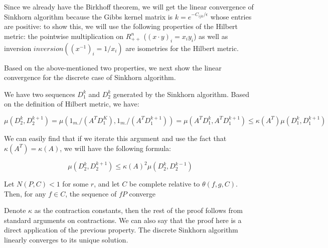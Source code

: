 
Since we already have the Birkhoff theorem, we will get the linear convergence of Sinkhorn algorithm because the Gibbs kernel matrix is $k=e^{-C_{ijk}/\epsilon}$ whose entries are positive: to show this, we will use the following properties of the Hilbert metric: 
the pointwise multiplication on $R_{++}^n$ ($(x\cdot y)_i = x_i y_i$) as well as inversion $inversion((x^{-1})_i = 1/x_i)$ are isometries for the Hilbert metric. 


Based on the above-mentioned two properties, we next show the linear convergence for the discrete case of Sinkhorn algorithm.

We have two sequences $D_1^k$ and $D_2^k$ generated by the Sinkhorn algorithm. Based on the definition of Hilbert metric, we have:

\begin{equation}
    \mu(D_2^k,D_2^{k+1}) = \mu(1_{m.}/(A^T D^K_1),1_{m.}/(A^T D^{k+1}_1)) = \mu(A^T D^k_1, A^T D_1^{k+1}) \leq \kappa(A^T)\mu(D_1^k,D_1^{k+1})
\end{equation}

We can easily find that if we iterate this argument and use the fact that $\kappa(A^T) = \kappa(A)$, we will have the following formula:

\begin{equation}
    \mu(D_2^k,D_2^{k+1}) \leq \kappa(A)^2 \mu(D_2^k,D_2^{k-1})
\end{equation}




Let $N(P,C)<1$ for some $r$, and let $C$ be complete relative to $\theta(f,g,C)$. Then, for any $f\in C$, the sequence of $fP$ converge 


Denote $\kappa$ as the contraction constants, 
then the rest of the proof follows from standard arguments on contractions. We can also say that the proof here is a direct application of the previous property. 
The discrete Sinkhorn algorithm linearly converges to its unique solution. 

